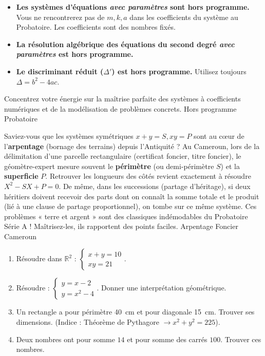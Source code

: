\documentclass[11pt]{article}
\newcommand{\cle}[1]{{\popxbold\color{popdark}#1}}
\begin{document}
\begin{attention}
\begin{itemize}
    \item \textbf{Les systèmes d'équations \emph{avec paramètres} sont hors programme.} Vous ne rencontrerez pas de $m, k, a$ dans les coefficients du système au Probatoire. Les coefficients sont des nombres fixés.
    \item \textbf{La résolution algébrique des équations du second degré \emph{avec paramètres} est hors programme.}
    \item \textbf{Le discriminant réduit ($\Delta'$) est hors programme.} Utilisez toujours $\Delta = b^2 - 4ac$.
\end{itemize}
Concentrez votre énergie sur la maîtrise parfaite des systèmes à coefficients numériques et de la modélisation de problèmes concrets.
\cle{Hors programme} \cle{Probatoire}
\end{attention}

\begin{savaistu}
Saviez-vous que les systèmes symétriques $x+y=S, xy=P$ sont au cœur de l'\textbf{arpentage} (bornage des terrains) depuis l'Antiquité ? Au Cameroun, lors de la délimitation d'une parcelle rectangulaire (certificat foncier, titre foncier), le géomètre-expert mesure souvent le \textbf{périmètre} (ou demi-périmètre $S$) et la \textbf{superficie} $P$. Retrouver les longueurs des côtés revient exactement à résoudre $X^2 - SX + P = 0$.
De même, dans les successions (partage d'héritage), si deux héritiers doivent recevoir des parts dont on connaît la somme totale et le produit (lié à une clause de partage proportionnel), on tombe sur ce même système. Ces problèmes « terre et argent » sont des classiques indémodables du Probatoire Série A ! Maîtrisez-les, ils rapportent des points faciles.
\cle{Arpentage} \cle{Foncier} \cle{Cameroun}
\end{savaistu}

\begin{exercice}
\begin{enumerate}
    \item Résoudre dans $\mathbb{R}^2$ : $\begin{cases} x+y=10 \\ xy=21 \end{cases}$.
    \item Résoudre : $\begin{cases} y = x - 2 \\ y = x^2 - 4 \end{cases}$. Donner une interprétation géométrique.
    \item Un rectangle a pour périmètre \SI{40}{cm} et pour diagonale \SI{15}{cm}. Trouver ses dimensions. (Indice : Théorème de Pythagore $\to x^2+y^2=225$).
    \item Deux nombres ont pour somme $14$ et pour somme des carrés $100$. Trouver ces nombres.
\end{enumerate}
\end{exercice}
\end{document}
